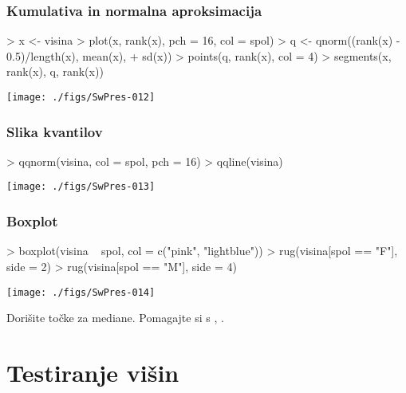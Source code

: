 \begin{frame}[fragile]
\frametitle{Kumulativa in normalna aproksimacija}
 {\vspace{-1cm}}
\begin{Schunk}
\begin{Sinput}
> x <- visina
> plot(x, rank(x), pch = 16, col = spol)
> q <- qnorm((rank(x) - 0.5)/length(x), mean(x), 
+     sd(x))
> points(q, rank(x), col = 4)
> segments(x, rank(x), q, rank(x))
\end{Sinput}
\end{Schunk}
\texttt{[image: ./figs/SwPres-012]}
\end{frame}
\begin{frame}[fragile]
\frametitle{Slika kvantilov}
 {\vspace{-1cm}}
\begin{Schunk}
\begin{Sinput}
> qqnorm(visina, col = spol, pch = 16)
> qqline(visina)
\end{Sinput}
\end{Schunk}
\texttt{[image: ./figs/SwPres-013]}
\end{frame}
\begin{frame}[fragile]
\frametitle{Boxplot}
 {\vspace{-1cm}}
\begin{Schunk}
\begin{Sinput}
> boxplot(visina ~ spol, col = c("pink", "lightblue"))
> rug(visina[spol == "F"], side = 2)
> rug(visina[spol == "M"], side = 4)
\end{Sinput}
\end{Schunk}
\texttt{[image: ./figs/SwPres-014]}

Dorišite točke za mediane. Pomagajte si s , .
\end{frame}

\section{Testiranje višin}

